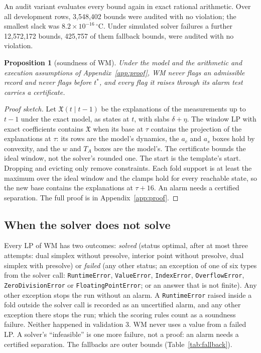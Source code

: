\documentclass[11pt,a4paper]{article}
\newtheorem{proposition}{Proposition}
\newcommand{\degC}{\ensuremath{{}^\circ}C}
\newcommand{\sci}[2]{\ensuremath{#1\times10^{#2}}}
\newcommand{\tstar}{t^{\ast}}
\begin{document}
An audit variant evaluates every bound again in exact rational arithmetic. Over all development rows, 3,548,402 bounds
were audited with no violation; the smallest slack was \sci{8.2}{-16}\,\degC. Under simulated solver failures a further
12,572,172 bounds, 425,757 of them fallback bounds, were audited with no violation.

\begin{proposition}[soundness of WM]\label{prop:wm}
Under the model and the arithmetic and execution assumptions of Appendix~\ref{app:proof}, WM never flags an
admissible record and never flags before $\tstar$, and every flag it raises through its alarm test carries a
certificate.
\end{proposition}
\begin{proof}[Proof sketch]
Let $\mathfrak{X}(t\mid t-1)$ be the explanations of the measurements up to $t-1$ under the exact model, as states at
$t$, with slabs $\delta+\eta$. The window LP with exact coefficients contains $\mathfrak{X}$ when its base at $\tau$
contains the projection of the explanations at $\tau$: its rows are the model's dynamics, the $a_c$ and $a_s$ boxes
hold by convexity, and the $w$ and $T_A$ boxes are the model's. The certificate bounds the ideal window, not the
solver's rounded one. The start is the template's start. Dropping and evicting only remove constraints. Each fold
support is at least the maximum over the ideal window and the clamps hold for every reachable state, so the new base
contains the explanations at $\tau+16$. An alarm needs a certified separation. The full proof is in
Appendix~\ref{app:proof}.
\end{proof}

\subsection{When the solver does not solve}\label{sec:fallback}

Every LP of WM has two outcomes: \emph{solved} (status optimal, after at most three attempts: dual simplex without
presolve, interior point without presolve, dual simplex with presolve) or \emph{failed} (any other status; an exception
of one of six types from the solver call: \texttt{RuntimeError}, \texttt{ValueError}, \texttt{IndexError},
\texttt{OverflowError}, \texttt{ZeroDivisionError} or \texttt{FloatingPointError}; or an answer that is not finite).
Any other exception stops the run without an alarm. A \texttt{RuntimeError} raised inside a fold outside the solver
call is recorded as an uncertified alarm, and any other exception there stops the run; which the scoring rules count as a soundness failure. Neither happened in validation 3. WM never uses a value from a failed LP. A solver's
``infeasible'' is one more failure, not a proof: an alarm needs a certified separation. The fallbacks are outer bounds
(Table~\ref{tab:fallback}).
\end{document}
